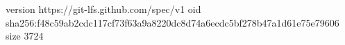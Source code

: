 version https://git-lfs.github.com/spec/v1
oid sha256:f48c59ab2cdc117cf73f63a9a8220dc8d74a6ecdc5bf278b47a1d61e75e79606
size 3724
